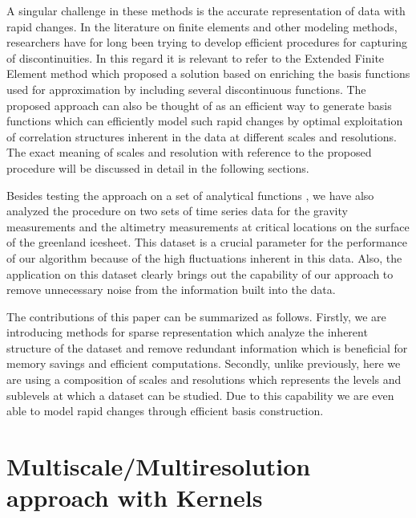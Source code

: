 \documentclass[procedia]{easychair}
\begin{document}
A singular challenge in these methods is the accurate representation of data with rapid changes. In the literature on finite elements and other modeling methods, researchers have for long been trying to develop efficient procedures for capturing of discontinuities. In this regard it is relevant to refer to the Extended Finite Element method \cite{NME:NME726}  which proposed a solution based on enriching the basis functions used for approximation by including several discontinuous functions. The proposed approach can also be thought of as an efficient way to generate basis functions which can efficiently model such rapid changes by optimal exploitation of correlation structures inherent in the data at different scales and resolutions. The exact meaning of scales and resolution with reference to the proposed procedure will be discussed in detail in the following sections.

Besides testing the approach on a set of analytical functions \cite{simulationlib}, we have also analyzed the procedure on two sets of time series data for the gravity measurements \cite{luthcke2013antarctica} and the altimetry measurements \cite{schenk2012new} at critical locations on the surface of the greenland icesheet. This dataset is a crucial parameter for the performance of our algorithm because of the high fluctuations inherent in this data. Also, the application on this dataset clearly brings out the capability of our approach to remove unnecessary noise from the information built into the data.

The contributions of this paper can be summarized as follows. Firstly, we are introducing methods for sparse representation which analyze the inherent structure of the dataset and remove redundant information which is beneficial for memory savings and efficient computations. Secondly, unlike previously, here we are using a composition of scales and resolutions which represents the levels and sublevels at which a dataset can be studied. Due to this capability we are even able to model rapid changes through efficient basis construction.





\section{Multiscale/Multiresolution approach with Kernels }
\label{sect:approach}
\end{document}
